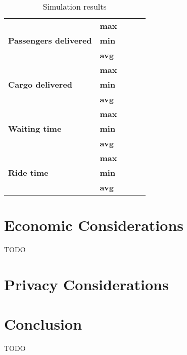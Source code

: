 \begin{table}[]
\begin{tabular}{llrrr}
\hline                                               
\multirow{3}{*}{\textbf{Passengers delivered}} & \textbf{max} &                   &                    &                  \\
                                               & \textbf{min} &                   &                    &                  \\
                                               & \textbf{avg} &                   &                    &                  \\
\hline                                               
\multirow{3}{*}{\textbf{Cargo delivered}}      & \textbf{max} &                   &                    &                  \\
                                               & \textbf{min} &                   &                    &                  \\
                                               & \textbf{avg} &                   &                    &                  \\
\hline                                               
\multirow{3}{*}{\textbf{Waiting time}}         & \textbf{max} &                   &                    &                  \\
                                               & \textbf{min} &                   &                    &                  \\
                                               & \textbf{avg} &                   &                    &                  \\
\hline
\multirow{3}{*}{\textbf{Ride time}}            & \textbf{max} &                   &                    &                  \\
                                               & \textbf{min} &                   &                    &                  \\
                                               & \textbf{avg} &                   &                    &                                 
\end{tabular}
\caption{\label{tab:impl:simulationresults} Simulation results}
\end{table}

\section{Economic Considerations}
TODO

\section{Privacy Considerations}

\section{Conclusion}
TODO